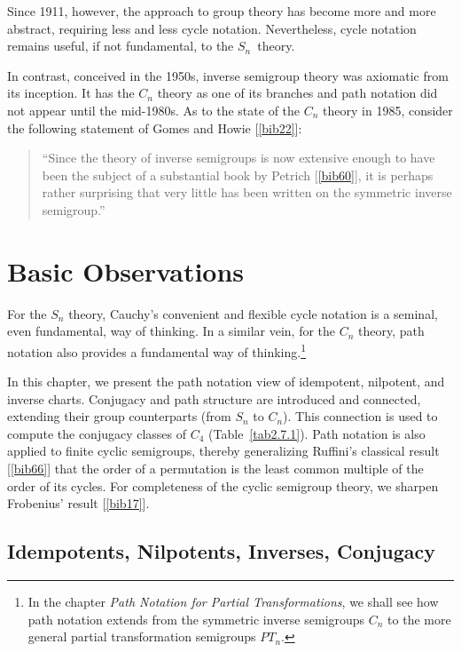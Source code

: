 \documentclass{surv-l}
\numberwithin{equation}{section}
\numberwithin{table}{section}
\numberwithin{figure}{section}
\theoremstyle{plain}
\theoremstyle{definition}
\begin{document}
Since 1911, however, the approach to group theory has become more
and more abstract, requiring less and less cycle notation.
Nevertheless, cycle notation remains useful, if not fundamental,
to the $S_{n}$~theory.

In contrast, conceived in the 1950s, inverse semigroup theory was
axiomatic from its inception. It has the $C_{n}$ theory as one of
its branches and path notation did not appear until the mid-1980s.
As to the state of the $C_{n}$ theory in 1985, consider the
following statement of Gomes and
Howie [\ref{bib22}]:
\begin{quote}
``Since the theory of inverse semigroups is now extensive enough
to have been the subject of a substantial book by Petrich
[\ref{bib60}], it is perhaps rather surprising
that very little has been written on the symmetric inverse
semigroup.''
\end{quote}

\chapter{Basic Observations}\label{chap2}

For the $S_{n}$ theory, Cauchy's convenient and flexible cycle
notation is a seminal, even fundamental, way of thinking. In a
similar vein, for the $C_{n}$ theory, path notation also provides
a fundamental way of thinking.\footnote{In the chapter \emph{Path
Notation for Partial Transformations}, we shall see how path
notation extends from the symmetric inverse semigroups $C_{n}$ to
the more general partial transformation semigroups $PT_{n}$.}

In this chapter, we present the path notation view of idempotent,
nilpotent, and inverse charts. Conjugacy and path structure are
introduced and connected, extending their group counterparts (from
$S_{n}$ to $C_{n}$). This connection is used to compute the
conjugacy classes of $C_{4}$ (Table~\ref{tab2.7.1}). Path notation
is also applied to finite cyclic semigroups, thereby generalizing
Ruffini's classical result [\ref{bib66}] that
the order of a permutation is the least common multiple of the
order of its cycles. For completeness of the cyclic semigroup
theory, we sharpen Frobenius' result [\ref{bib17}].

\setcounter{section}{4}
\section{Idempotents, Nilpotents, Inverses, Conjugacy}\label{sec2.5}
\end{document}
